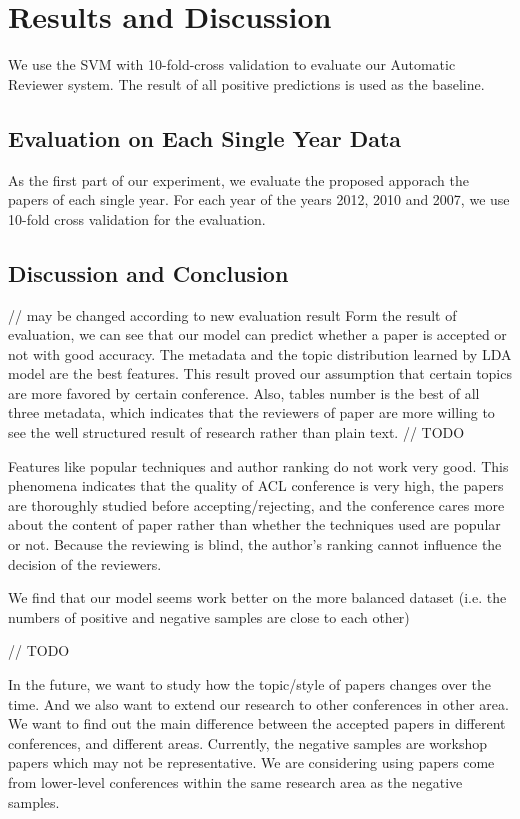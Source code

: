 \documentclass[11pt,letterpaper]{article}
\begin{document}
\section{Results and Discussion}
We use the SVM with 10-fold-cross validation to evaluate our Automatic Reviewer system. The result of all positive predictions is used as the baseline. 


\subsection{Evaluation on Each Single Year Data}
As the first part of our experiment, 
we evaluate the proposed apporach the papers of each single year.
For each year of the years 2012, 2010 and 2007, 
we use 10-fold cross validation for the evaluation.



\subsection{Discussion and Conclusion} 

// may be changed according to new evaluation result
Form the result of evaluation, we can see that our model can predict whether a paper is accepted or not with good accuracy. The metadata and the topic distribution learned by LDA model are the best features. This result proved our assumption that certain topics are more favored by certain conference. Also, tables number is the best of all three metadata, which indicates that the reviewers of paper are more willing to see the well structured result of research rather than plain text. // TODO 

Features like popular techniques and author ranking do not work very good. This phenomena indicates that the quality of ACL conference is very high, the papers are thoroughly studied before accepting/rejecting, and the conference cares more about the content of paper rather than whether the techniques used are popular or not. Because the reviewing is blind, the author’s ranking cannot influence the decision of the reviewers. 

We find that our model seems work better on the more balanced dataset (i.e. the numbers of positive and negative samples are close to each other)

// TODO


In the future, we want to study how the topic/style of papers changes over the time. And we also want to extend our research to other conferences in other area. We want to find out the main difference between the accepted papers in different conferences, and different areas. 
Currently, the negative samples are workshop papers which may not be representative.  We are considering using papers come from lower-level conferences within the same research area as the negative samples. 
\end{document}
